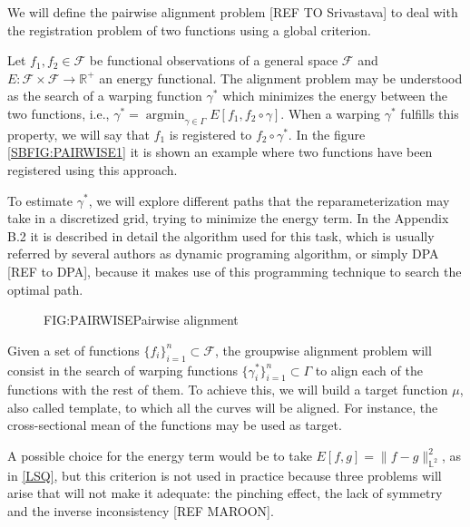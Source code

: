 
We will define the pairwise alignment problem [REF TO Srivastava] to deal with
the registration problem of two functions using a global criterion.

Let $f_1, f_2 \in \mathcal{F}$ be functional observations of a general space
$\mathcal{F}$ and $E: \mathcal{F} \times \mathcal{F} \rightarrow \mathbb{R}^+$ an energy
functional. The alignment problem may be understood as the search of a warping
function $\gamma^*$ which minimizes the energy between the two functions, i.e.,
$\gamma^* = \operatorname{argmin}_{\gamma \in \Gamma} E[f_1, f_2 \circ \gamma]$.
When a warping $\gamma^*$ fulfills this property, we will say that $f_1$ is
registered to $f_2 \circ \gamma^*$. In the figure \ref{SBFIG:PAIRWISE1} it is
shown an example where two functions have been registered using this approach.

To estimate $\gamma^*$, we will explore different paths that the
reparameterization may take in a discretized grid, trying to minimize the energy
term. In the Appendix B.2 it is described in detail the algorithm used for this
task, which is usually referred by several authors as dynamic programing
algorithm, or simply DPA [REF to DPA], because it makes use of this programming
technique to search the optimal path.

\begin{figure}[Pairwise alignment]{FIG:PAIRWISE}{Pairwise alignment}
   \quad
\end{figure}

Given a set of functions $\{f_i\}_{i=1}^n \subset \mathcal{F}$, the
groupwise alignment problem will consist in the search of warping functions
$\{\gamma_i^* \}_{i=1}^n \subset \Gamma$ to align each of the functions with the
rest of them. To achieve this, we will build a target function $\mu$, also
called template, to which all the curves will be aligned. For instance,
the cross-sectional mean of the functions may be used as target.

A possible choice for the energy term would be to take
$E[f,g]= \|f - g\|_{\mathbb{L}^2}^2$, as in \ref{LSQ}, but
this criterion is not used in practice because three
problems will arise that will not make it adequate: the pinching effect, the
lack of symmetry and the inverse inconsistency [REF MAROON].
